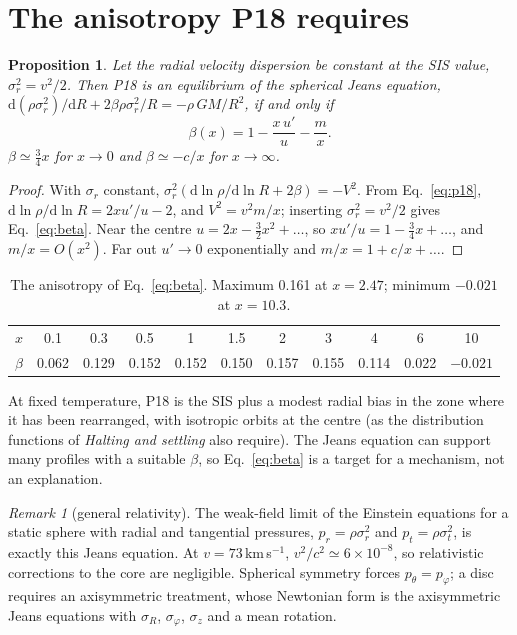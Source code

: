 \documentclass[11pt,a4paper]{article}
\newtheorem{proposition}{Proposition}
\theoremstyle{definition}
\theoremstyle{remark}
\newtheorem*{remark}{Remark}
\newcommand{\dd}{\mathrm{d}}
\begin{document}
\section{The anisotropy P18 requires}\label{sec:jeans}

\begin{proposition}\label{prop:jeans}
Let the radial velocity dispersion be constant at the SIS value, $\sigma_r^2=v^2/2$. Then P18
is an equilibrium of the spherical Jeans equation,
$\dd(\rho\sigma_r^2)/\dd R+2\beta\rho\sigma_r^2/R=-\rho\,GM/R^2$, if and only if
\begin{equation}
  \beta(x)=1-\frac{x\,u'}{u}-\frac{m}{x}.
  \label{eq:beta}
\end{equation}
$\beta\simeq\tfrac34x$ for $x\to0$ and $\beta\simeq-c/x$ for $x\to\infty$.
\end{proposition}
\begin{proof}
With $\sigma_r$ constant, $\sigma_r^2(\dd\ln\rho/\dd\ln R+2\beta)=-V^2$. From
Eq.~\eqref{eq:p18}, $\dd\ln\rho/\dd\ln R=2xu'/u-2$, and $V^2=v^2m/x$; inserting
$\sigma_r^2=v^2/2$ gives Eq.~\eqref{eq:beta}. Near the centre $u=2x-\tfrac32x^2+\dots$, so
$xu'/u=1-\tfrac34x+\dots$, and $m/x=O(x^2)$. Far out $u'\to0$ exponentially and
$m/x=1+c/x+\dots$.
\end{proof}

\begin{table}[h]
\centering\small
\caption{The anisotropy of Eq.~\eqref{eq:beta}. Maximum 0.161 at $x=2.47$; minimum $-0.021$
at $x=10.3$.}
\label{tab:beta}
\begin{tabular}{lcccccccccc}
\toprule
$x$ & 0.1 & 0.3 & 0.5 & 1 & 1.5 & 2 & 3 & 4 & 6 & 10\\
$\beta$ & 0.062 & 0.129 & 0.152 & 0.152 & 0.150 & 0.157 & 0.155 & 0.114 & 0.022 & $-0.021$\\
\bottomrule
\end{tabular}
\end{table}

At fixed temperature, P18 is the SIS plus a modest radial bias in the zone where it has been
rearranged, with isotropic orbits at the centre (as the distribution functions of
\emph{Halting and settling} also require). The Jeans equation can support many profiles with
a suitable $\beta$, so Eq.~\eqref{eq:beta} is a target for a mechanism, not an explanation.

\begin{remark}[general relativity]
The weak-field limit of the Einstein equations for a static sphere with radial and tangential
pressures, $p_r=\rho\sigma_r^2$ and $p_t=\rho\sigma_t^2$, is exactly this Jeans equation. At
$v=73\,$km\,s$^{-1}$, $v^2/c^2\simeq6\times10^{-8}$, so relativistic corrections to the core
are negligible. Spherical symmetry forces $p_\theta=p_\varphi$; a disc requires an axisymmetric
treatment, whose Newtonian form is the axisymmetric Jeans equations with $\sigma_R$,
$\sigma_\varphi$, $\sigma_z$ and a mean rotation.
\end{remark}
\end{document}
